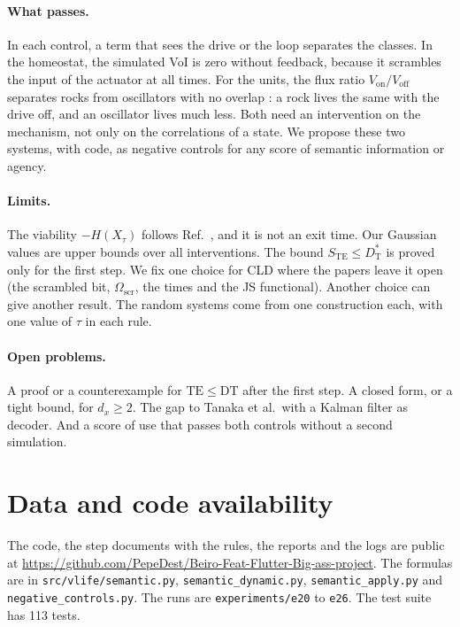 \documentclass[11pt]{article}
\newcommand{\STE}{S_{\mathrm{TE}}}
\newcommand{\DT}{D_{\mathrm{T}}^{\ast}}
\newcommand{\Oscr}{\Omega_{\mathrm{scr}}}
\newcommand{\Von}{V_{\mathrm{on}}}
\newcommand{\Voff}{V_{\mathrm{off}}}
\begin{document}
\paragraph{What passes.} In each control, a term that sees the drive or the loop separates the classes. In the
homeostat, the simulated VoI is zero without feedback, because it scrambles the input of the actuator at all times.
For the units, the flux ratio $\Von/\Voff$ separates rocks from oscillators with no overlap \cite{Beiro26}: a rock lives
the same with the drive off, and an oscillator lives much less. Both need an intervention on the mechanism, not only on
the correlations of a state. We propose these two systems, with code, as negative controls for any score of semantic
information or agency.

\paragraph{Limits.} The viability $-H(X_\tau)$ follows Ref.~\cite{KolchinskyWolpert18}, and it is not an exit time. Our
Gaussian values are upper bounds over all interventions. The bound $\STE\le\DT$ is proved only for the first step. We
fix one choice for CLD where the papers leave it open (the scrambled bit, $\Oscr$, the times and the JS functional).
Another choice can give another result. The random systems come from one construction each, with one value of $\tau$
in each rule.

\paragraph{Open problems.} A proof or a counterexample for $\mathrm{TE}\le\mathrm{DT}$ after the first step. A closed
form, or a tight bound, for $d_x\ge2$. The gap to Tanaka et al.\ with a Kalman filter as decoder. And a score of use
that passes both controls without a second simulation.

\section*{Data and code availability}
The code, the step documents with the rules, the reports and the logs are public at
\url{https://github.com/PepeDest/Beiro-Feat-Flutter-Big-ass-project}. The formulas are in
\texttt{src/vlife/semantic.py}, \texttt{semantic\_dynamic.py}, \texttt{semantic\_apply.py} and
\texttt{negative\_controls.py}. The runs are \texttt{experiments/e20} to \texttt{e26}. The test suite has 113 tests.
\end{document}
